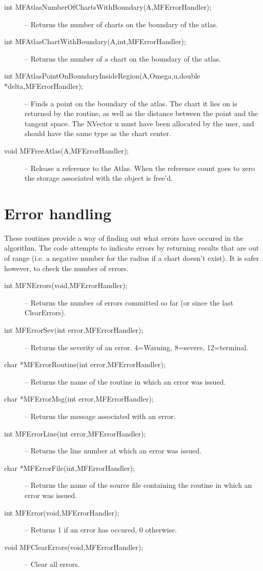 \documentclass[12pt]{article}
\begin{document}
\begin{description}
   \item [int MFAtlasNumberOfChartsWithBoundary(A,MFErrorHandler);]
   -- Returns the number of charts on the boundary of the atlas.
   \item [int MFAtlasChartWithBoundary(A,int,MFErrorHandler);]
   -- Returns the number of a chart on the boundary of the atlas.
   \item [int MFAtlasPointOnBoundaryInsideRegion(A,Omega,u,double *delta,MFErrorHandler);]
   -- Finds a point on the boundary of the atlas. The chart it lies on is returned by the routine,
   as well as the distance between the point and the tangent space. The NVector {u} must have been 
   allocated by the user, and should have the same type as the chart center.
   \item [void MFFreeAtlas(A,MFErrorHandler);]
-- Release a reference to the Atlas. When the reference count goes to zero the
   storage associated with the object is free'd.
  \end{description}

\section{Error handling}
 
    These routines provide a way of finding out what errors have occured in
    the algorithm. The code attempts to indicate errors by returning results
    that are out of range (i.e. a negative number for the radius if a chart doesn't 
    exist). It is safer however, to check the number of errors.
\begin{description}
\item [int MFNErrors(void,MFErrorHandler);]
-- Returns the number of errors committed so far (or since the last ClearErrors).
\item [int MFErrorSev(int error,MFErrorHandler);]
-- Returns the severity of an error. 4=Warning, 8=severe, 12=terminal.
\item [char *MFErrorRoutine(int error,MFErrorHandler);]
-- Returns the name of the routine in which an error was issued.
\item [char *MFErrorMsg(int error,MFErrorHandler);]
-- Returns the message associated with an error.
\item [int MFErrorLine(int error,MFErrorHandler);]
-- Returns the line number at which an error was issued.
\item [char *MFErrorFile(int,MFErrorHandler);]
-- Returns the name of the source file containing the routine in which an error was issued.
\item [int MFError(void,MFErrorHandler);]
-- Returns 1 if an error has occured, 0 otherwise.
\item [void MFClearErrors(void,MFErrorHandler);]
-- Clear all errors.
\end{description}
\end{document}
